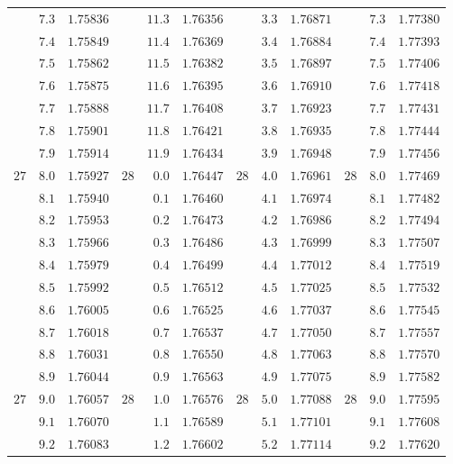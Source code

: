 \begin{center}
{{\begin{minipage}[t][500pt][t]{.96\linewidth}
{\begin{tabular}{rr|r||rr|r||rr|r||rr|r}
 & $7.3$ & $1.75836$ &  & $11.3$ & $1.76356$ &  & $3.3$ & $1.76871$ &  & $7.3$ & $1.77380$\\
 & $7.4$ & $1.75849$ &  & $11.4$ & $1.76369$ &  & $3.4$ & $1.76884$ &  & $7.4$ & $1.77393$\\
 & $7.5$ & $1.75862$ &  & $11.5$ & $1.76382$ &  & $3.5$ & $1.76897$ &  & $7.5$ & $1.77406$\\
 & $7.6$ & $1.75875$ &  & $11.6$ & $1.76395$ &  & $3.6$ & $1.76910$ &  & $7.6$ & $1.77418$\\
 & $7.7$ & $1.75888$ &  & $11.7$ & $1.76408$ &  & $3.7$ & $1.76923$ &  & $7.7$ & $1.77431$\\
 & $7.8$ & $1.75901$ &  & $11.8$ & $1.76421$ &  & $3.8$ & $1.76935$ &  & $7.8$ & $1.77444$\\
 & $7.9$ & $1.75914$ &  & $11.9$ & $1.76434$ &  & $3.9$ & $1.76948$ &  & $7.9$ & $1.77456$\\[4pt]
$27$ & $8.0$ & $1.75927$ & $28$ & $0.0$ & $1.76447$ & $28$ & $4.0$ & $1.76961$ & $28$ & $8.0$ & $1.77469$\\
 & $8.1$ & $1.75940$ &  & $0.1$ & $1.76460$ &  & $4.1$ & $1.76974$ &  & $8.1$ & $1.77482$\\
 & $8.2$ & $1.75953$ &  & $0.2$ & $1.76473$ &  & $4.2$ & $1.76986$ &  & $8.2$ & $1.77494$\\
 & $8.3$ & $1.75966$ &  & $0.3$ & $1.76486$ &  & $4.3$ & $1.76999$ &  & $8.3$ & $1.77507$\\
 & $8.4$ & $1.75979$ &  & $0.4$ & $1.76499$ &  & $4.4$ & $1.77012$ &  & $8.4$ & $1.77519$\\
 & $8.5$ & $1.75992$ &  & $0.5$ & $1.76512$ &  & $4.5$ & $1.77025$ &  & $8.5$ & $1.77532$\\
 & $8.6$ & $1.76005$ &  & $0.6$ & $1.76525$ &  & $4.6$ & $1.77037$ &  & $8.6$ & $1.77545$\\
 & $8.7$ & $1.76018$ &  & $0.7$ & $1.76537$ &  & $4.7$ & $1.77050$ &  & $8.7$ & $1.77557$\\
 & $8.8$ & $1.76031$ &  & $0.8$ & $1.76550$ &  & $4.8$ & $1.77063$ &  & $8.8$ & $1.77570$\\
 & $8.9$ & $1.76044$ &  & $0.9$ & $1.76563$ &  & $4.9$ & $1.77075$ &  & $8.9$ & $1.77582$\\[4pt]
$27$ & $9.0$ & $1.76057$ & $28$ & $1.0$ & $1.76576$ & $28$ & $5.0$ & $1.77088$ & $28$ & $9.0$ & $1.77595$\\
 & $9.1$ & $1.76070$ &  & $1.1$ & $1.76589$ &  & $5.1$ & $1.77101$ &  & $9.1$ & $1.77608$\\
 & $9.2$ & $1.76083$ &  & $1.2$ & $1.76602$ &  & $5.2$ & $1.77114$ &  & $9.2$ & $1.77620$\\

\end{tabular}}
\end{minipage}}}
\end{center}
